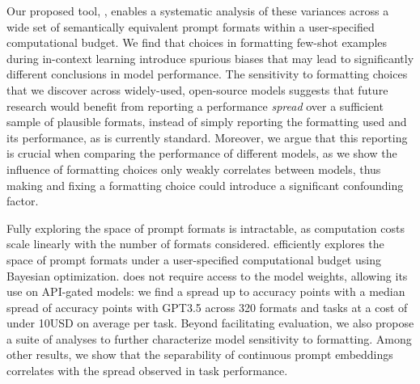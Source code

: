 


Our proposed tool, \toolname{}, enables a systematic analysis of these variances across a wide set of semantically equivalent prompt formats within a user-specified computational budget.
We find that choices in formatting few-shot examples during in-context learning introduce spurious biases that may lead to significantly different conclusions in model performance. 
The sensitivity to formatting choices that we discover across widely-used, open-source models suggests that future research would benefit from reporting a performance \textit{spread} over a sufficient sample of plausible formats, instead of simply reporting the formatting used and its performance, as is currently standard.
Moreover, we argue that this reporting is crucial when comparing the performance of different models, as we show the influence of formatting choices only weakly correlates between models, thus making and fixing a formatting choice could introduce a significant confounding factor.

Fully exploring the space of prompt formats is intractable, as computation costs scale linearly with the number of formats considered. \toolname{} efficiently explores the space of prompt formats under a user-specified computational budget using Bayesian optimization. 
\toolname{} does not require access to the model weights, allowing its use on API-gated models: we find a spread up to  accuracy points with a median spread of  accuracy points with GPT3.5 across 320 formats and  tasks at a cost of under 10USD on average per task. 
Beyond facilitating evaluation, we also propose a suite of analyses to further characterize model sensitivity to formatting. Among other results,  we show that the separability of continuous prompt embeddings correlates with the spread observed in task performance. %


